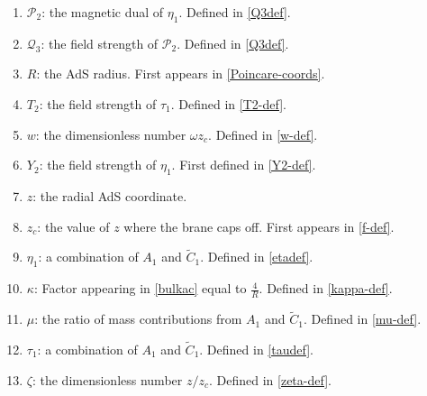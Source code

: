 \documentclass[aps,preprint,nofootinbib,preprintnumbers,eqsecnum,superscriptaddress]{revtex4}
\begin{document}
\begin{appendix}
\begin{enumerate}
\item $\mathcal{P}_2$: the magnetic dual of $\eta_1$. Defined in \eqref{Q3def}.
\item $\mathcal{Q}_3$: the field strength of $\mathcal{P}_2$. Defined in \eqref{Q3def}.
\item $R$: the AdS radius. First appears in \eqref{Poincare-coords}.
\item $T_2$: the field strength of $\tau_1$. Defined in \eqref{T2-def}.
\item $w$: the dimensionless number $\omega z_c$. Defined in \eqref{w-def}.
\item $Y_2$: the field strength of $\eta_1$. First defined in \eqref{Y2-def}.
\item $z$: the radial AdS coordinate.
\item $z_c$: the value of $z$ where the brane caps off. First appears in \eqref{f-def}.
\item $\eta_1$: a combination of $A_1$ and $\tilde{C}_1$. Defined in \eqref{etadef}.
\item $\kappa$: Factor appearing in \eqref{bulkac} equal to $\frac{4}{R}$. Defined in \eqref{kappa-def}.
\item $\mu$: the ratio of mass contributions from $A_1$ and $\tilde{C}_1$. Defined in \eqref{mu-def}.
\item $\tau_1$: a combination of $A_1$ and $\tilde{C}_1$. Defined in \eqref{taudef}.
\item $\zeta$: the dimensionless number $z/z_c$. Defined in \eqref{zeta-def}.


\end{enumerate}

\end{appendix}


\end{document}

